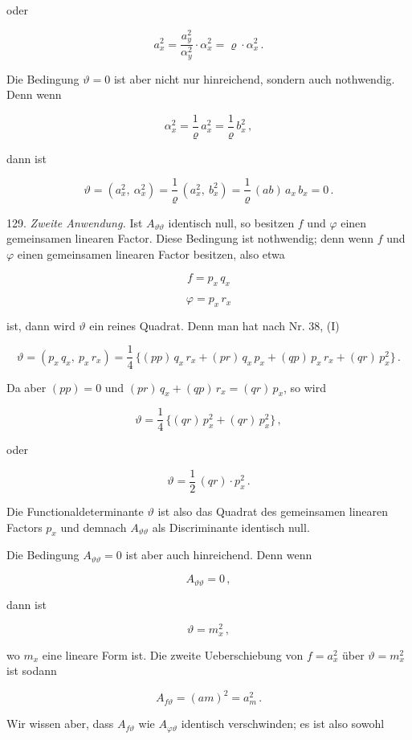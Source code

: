 oder

\[
a_x^2 = \frac{a_y^2}{\alpha_y^2}\cdot\alpha_x^2 = \varrho\cdot\alpha_x^2\,.
\]

Die Bedingung $\vartheta = 0$ ist aber nicht nur hinreichend, sondern
auch nothwendig. Denn wenn

\[
\alpha_x^2 = \frac{1}{\varrho}\,a_x^2 = \frac{1}{\varrho}\,b_x^2\,,
\]

dann ist

\[
\vartheta = (a_x^2,\ \alpha_x^2) = \frac{1}{\varrho}\,(a_x^2,\ b_x^2) = \frac{1}{\varrho}\,(ab)\,a_x\,b_x = 0\,.
\]

129. \textit{Zweite Anwendung.} Ist $A_{\vartheta\vartheta}$ identisch null, so besitzen $f$ und
$\varphi$ einen gemeinsamen linearen Factor. Diese Bedingung ist nothwendig; denn wenn $f$ und $\varphi$ einen gemeinsamen linearen Factor besitzen, also etwa

\[
f = p_x\,q_x
\]

\[
\varphi = p_x\,r_x
\]

ist, dann wird $\vartheta$ ein reines Quadrat. Denn man hat nach Nr. 38, (I)

\[
\vartheta = (p_x\,q_x,\ p_x\,r_x) = \frac{1}{4}\,\{(pp)\,q_x\,r_x + (pr)\,q_x\,p_x + (qp)\,p_x\,r_x + (qr)\,p_x^2\}\,.
\]

Da aber $(pp) = 0$ und $(pr)\,q_x + (qp)\,r_x = (qr)\,p_x$, so wird

\[
\vartheta = \frac{1}{4}\,\{(qr)\,p_x^2 + (qr)\,p_x^2\}\,,
\]

oder

\[
\vartheta = \frac{1}{2}\,(qr)\cdot p_x^2\,.
\]

Die Functionaldeterminante $\vartheta$ ist also das Quadrat des gemeinsamen
linearen Factors $p_x$ und demnach $A_{\vartheta\vartheta}$ als Discriminante identisch null.

Die Bedingung $A_{\vartheta\vartheta} = 0$ ist aber auch hinreichend. Denn wenn

\[
A_{\vartheta\vartheta} = 0\,,
\]

dann ist

\[
\vartheta = m_x^2\,,
\]

wo $m_x$ eine lineare Form ist. Die zweite Ueberschiebung von $f = a_x^2$
über $\vartheta = m_x^2$ ist sodann

\[
A_{f\vartheta} = (am)^2 = a_m^2\,.
\]

Wir wissen aber, dass $A_{f\vartheta}$ wie $A_{\varphi\vartheta}$ identisch verschwinden; es
ist also sowohl

